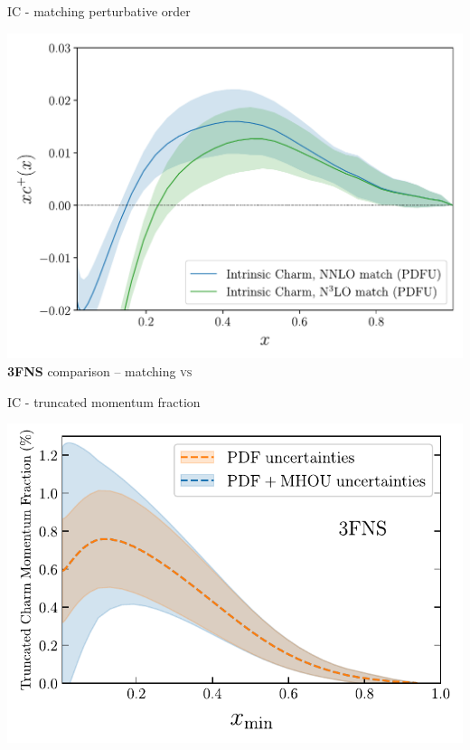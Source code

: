 \documentclass[9pt]{beamer}
\begin{document}
\begin{frame}{IC - matching perturbative order}
	\begin{center}
		\includegraphics[width=.9\linewidth]{3fns_nnlo_n3lo}\\
                \textbf{3FNS} comparison -- \nnlo matching \textsc{vs} \nnnlo
	\end{center}
\end{frame}
\begin{frame}{IC - truncated momentum fraction}
	\begin{center}
		\includegraphics[width=\linewidth]{charm_momfrac_xmin_dep_3fns.pdf}
	\end{center}
\end{frame}
\end{document}
